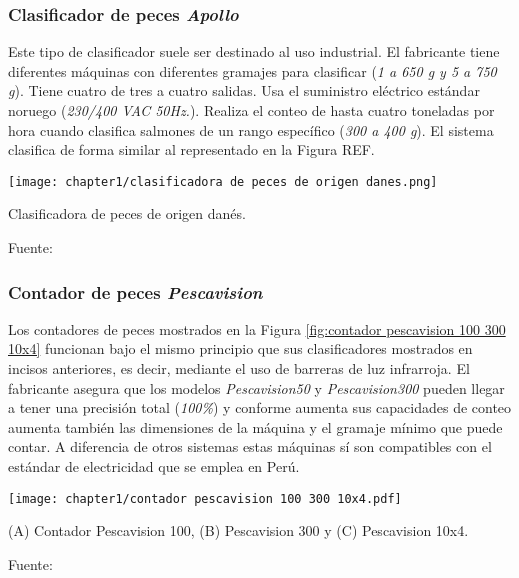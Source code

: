 
\normalsize
\subsubsection{Clasificador de peces \textit{Apollo}}

Este tipo de clasificador suele ser destinado al uso industrial. El fabricante tiene diferentes máquinas con diferentes gramajes para clasificar (\textit{1 a 650 g y 5 a 750 g}). Tiene cuatro de tres a cuatro salidas. Usa el suministro eléctrico estándar noruego (\textit{230/400 VAC 50Hz.}). Realiza el conteo de hasta cuatro toneladas por hora cuando clasifica salmones de un rango específico (\textit{300 a 400 g}). El sistema clasifica de forma similar al representado en la Figura REF. \citep{Apollo2013}

\begin{myfigure}[H]
	\footnotesize\centering
	\texttt{[image: chapter1/clasificadora de peces de origen danes.png]}
	\caption{Clasificadora de peces de origen danés.}
	\begin{myflushcenter}				
		Fuente: \citep{Apollo2013}
	\end{myflushcenter}
	\label{fig:clasificadora de peces de origen danes}
\end{myfigure}

\subsubsection{Contador de peces \textit{Pescavision}}

Los contadores de peces mostrados en la Figura \ref{fig:contador pescavision 100 300 10x4} funcionan bajo el mismo principio que sus clasificadores mostrados en incisos anteriores, es decir, mediante el uso de barreras de luz infrarroja. El fabricante asegura que los modelos \textit{Pescavision50} y \textit{Pescavision300} pueden llegar a tener una precisión total (\textit{100\%}) y conforme aumenta sus capacidades de conteo aumenta también las dimensiones de la máquina y el gramaje mínimo que puede contar. A diferencia de otros sistemas estas máquinas sí son compatibles con el estándar de electricidad que se emplea en Perú.

\begin{myfigure}[H]
	\footnotesize\centering
	\texttt{[image: chapter1/contador pescavision 100 300 10x4.pdf]}
	\caption[Contadores Pescavision 100,300 y 10x4]{(A) Contador Pescavision 100, (B) Pescavision 300 y  (C) Pescavision 10x4.}
	\begin{myflushcenter}				
		Fuente: \citep{FAIVRE2019a}
	\end{myflushcenter}	
	\label{fig:contador pescavision 100 300 10x4}
\end{myfigure}

